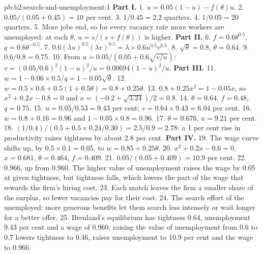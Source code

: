 \begin{solution}{pb:b2:search-and-unemployment:1}
\textbf{Part I.}
1. $\dot u = 0.05(1 - u) - f(\theta)u$.
2. $0.05/(0.05 + 0.45) = 10$ per cent.
3. $1/0.45 = 2.2$ quarters.
4. $1/0.05 = 20$ quarters.
5. More jobs end, so for every vacancy rate more workers are unemployed: at each $\theta$, $u = s/(s + f(\theta))$ is higher.
\textbf{Part II.}
6. $f = 0.6\theta^{0.5}$, $q = 0.6\theta^{-0.5}$.
7. $0.6(\lambda u)^{0.5}(\lambda v)^{0.5} = \lambda \times 0.6u^{0.5}v^{0.5}$.
8. $\sqrt\theta = 0.8$, $\theta = 0.64$.
9. $0.6/0.8 = 0.75$.
10. From $u = 0.05/(0.05 + 0.6\sqrt{v/u})$: $v = (0.05/0.6)^2(1 - u)^2/u = 0.00694(1 - u)^2/u$.
\textbf{Part III.}
11. $w = 1 - 0.06 \times 0.5/q = 1 - 0.05\sqrt\theta$.
12. $w = 0.5 \times 0.6 + 0.5(1 + 0.5\theta) = 0.8 + 0.25\theta$.
13. $0.8 + 0.25x^2 = 1 - 0.05x$, so $x^2 + 0.2x - 0.8 = 0$ and $x = (-0.2 + \sqrt{3.24})/2 = 0.8$.
14. $\theta = 0.64$, $f = 0.48$, $q = 0.75$.
15. $u = 0.05/0.53 = 9.43$ per cent; $v = 0.64 \times 9.43 = 6.04$ per cent.
16. $w = 0.8 + 0.16 = 0.96$ and $1 - 0.05 \times 0.8 = 0.96$.
17. $\theta = 0.676$, $u = 9.21$ per cent.
18. $(1/0.4)/(0.5 + 0.5 \times 0.24/0.30) = 2.5/0.9 = 2.78$: a 1 per cent rise in productivity raises tightness by about 2.8 per cent.
\textbf{Part IV.}
19. The wage curve shifts up, by $0.5 \times 0.1 = 0.05$, to $w = 0.85 + 0.25\theta$.
20. $x^2 + 0.2x - 0.6 = 0$, $x = 0.681$, $\theta = 0.464$, $f = 0.409$.
21. $0.05/(0.05 + 0.409) = 10.9$ per cent.
22. $0.966$, up from 0.960. The higher value of unemployment raises the wage by 0.05 at given tightness, but tightness falls, which lowers the
part of the wage that rewards the firm's hiring cost.
23. Each match leaves the firm a smaller share of the surplus, so fewer vacancies pay for their cost.
24. The search effort of the unemployed: more generous benefits let them search less intensely or wait longer for a
better offer.
25. Brenland's equilibrium has tightness 0.64, unemployment 9.43 per cent and a wage of 0.960; raising the value of unemployment from 0.6 to 0.7 lowers tightness to 0.46,
raises unemployment to 10.9 per cent and the wage to 0.966.
\end{solution}
